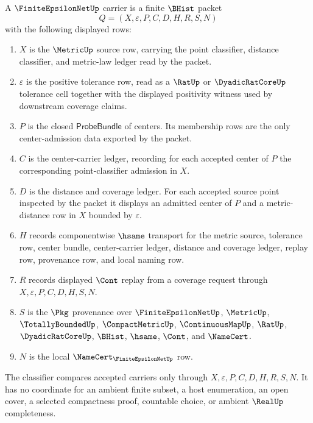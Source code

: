 \begin{definition}
\label{def:finite-epsilon-net-carrier}
A $\FiniteEpsilonNetUp$ carrier is a finite $\BHist$ packet
$$
Q=(X,\varepsilon,P,C,D,H,R,S,N)
$$
with the following displayed rows:
\begin{enumerate}
\item $X$ is the $\MetricUp$ source row, carrying the point classifier, distance classifier, and metric-law ledger read by the packet.
\item $\varepsilon$ is the positive tolerance row, read as a $\RatUp$ or $\DyadicRatCoreUp$ tolerance cell together with the displayed positivity witness used by downstream coverage claims.
\item $P$ is the closed $\mathsf{ProbeBundle}$ of centers. Its membership rows are the only center-admission data exported by the packet.
\item $C$ is the center-carrier ledger, recording for each accepted center of $P$ the corresponding point-classifier admission in $X$.
\item $D$ is the distance and coverage ledger. For each accepted source point inspected by the packet it displays an admitted center of $P$ and a metric-distance row in $X$ bounded by $\varepsilon$.
\item $H$ records componentwise $\hsame$ transport for the metric source, tolerance row, center bundle, center-carrier ledger, distance and coverage ledger, replay row, provenance row, and local naming row.
\item $R$ records displayed $\Cont$ replay from a coverage request through $X,\varepsilon,P,C,D,H,S,N$.
\item $S$ is the $\Pkg$ provenance over $\FiniteEpsilonNetUp$, $\MetricUp$, $\TotallyBoundedUp$, $\CompactMetricUp$, $\ContinuousMapUp$, $\RatUp$, $\DyadicRatCoreUp$, $\BHist$, $\hsame$, $\Cont$, and $\NameCert$.
\item $N$ is the local $\NameCert_{\FiniteEpsilonNetUp}$ row.
\end{enumerate}
The classifier compares accepted carriers only through $X,\varepsilon,P,C,D,H,R,S,N$. It has no coordinate for an ambient finite subset, a host enumeration, an open cover, a selected compactness proof, countable choice, or ambient $\RealUp$ completeness.
\end{definition}

